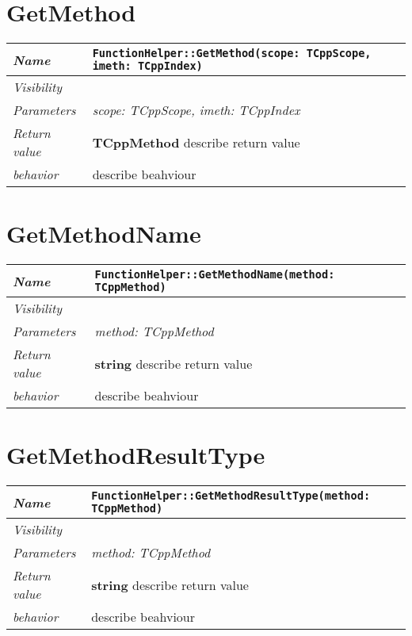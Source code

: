  \section{GetMethod}
\begin{longtable}{p{3cm} @{\hskip 1cm} p{12cm}}
 \hline
\textit{Name} & \texttt{FunctionHelper::GetMethod(scope: TCppScope, imeth: TCppIndex)}\\
\hline
 \textit{Visibility} & \\
\hline
\textit{Parameters} & \textit{scope: TCppScope, imeth: TCppIndex}\\
\hline
\textit{Return value} & \textbf{ TCppMethod} describe return value\\
  \hline
 \textit{behavior} & describe beahviour \\
\hline
\end{longtable} \pagebreak
 \section{GetMethodName}
\begin{longtable}{p{3cm} @{\hskip 1cm} p{12cm}}
 \hline
\textit{Name} & \texttt{FunctionHelper::GetMethodName(method: TCppMethod)}\\
\hline
 \textit{Visibility} & \\
\hline
\textit{Parameters} & \textit{method: TCppMethod}\\
\hline
\textit{Return value} & \textbf{ string} describe return value\\
  \hline
 \textit{behavior} & describe beahviour \\
\hline
\end{longtable} \pagebreak
 \section{GetMethodResultType}
\begin{longtable}{p{3cm} @{\hskip 1cm} p{12cm}}
 \hline
\textit{Name} & \texttt{FunctionHelper::GetMethodResultType(method: TCppMethod)}\\
\hline
 \textit{Visibility} & \\
\hline
\textit{Parameters} & \textit{method: TCppMethod}\\
\hline
\textit{Return value} & \textbf{ string} describe return value\\
  \hline
 \textit{behavior} & describe beahviour \\
\hline
\end{longtable} \pagebreak
